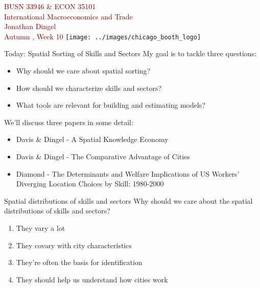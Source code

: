 \documentclass[10pt,notes=hide]{beamer}
\begin{document}
\begin{frame}[plain]
\begin{center}
\large
\textcolor{maroon}{BUSN 33946 \& ECON 35101\\
International Macroeconomics and Trade\\ 
Jonathan Dingel\\
Autumn \the\year, Week 10}
\vfill 
\texttt{[image: ../images/chicago\_booth\_logo]}
\end{center}
\end{frame}
\begin{frame}{Today: Spatial Sorting of Skills and Sectors}
My goal is to tackle three questions:
\begin{itemize}
	\item Why should we care about spatial sorting?
	\item How should we characterize skills and sectors?
	\item What tools are relevant for building and estimating models?
\end{itemize}
\vspace{5mm}
We'll discuss three papers in some detail:
\begin{itemize}
	\item Davis \& Dingel - A Spatial Knowledge Economy
	\item Davis \& Dingel - The Comparative Advantage of Cities
	\item Diamond - The Determinants and Welfare Implications of US Workers' Diverging Location Choices by Skill: 1980-2000 
\end{itemize}

\end{frame}



\begin{frame}{Spatial distributions of skills and sectors} 
Why should we care about the spatial distributions of skills and sectors?
\begin{enumerate}
	\item They vary a lot
	\item They covary with city characteristics
	\item They're often the basis for identification 
	\item They should help us understand how cities work
\end{enumerate}
\end{frame}
\end{document}
